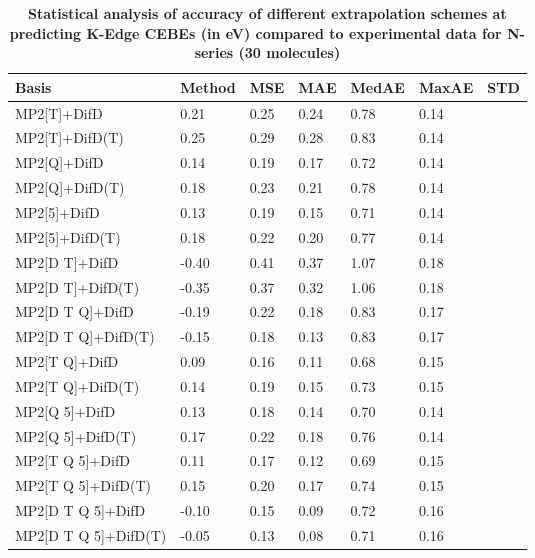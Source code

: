 \begin{table}
  \caption{\textbf{Statistical analysis of accuracy of different extrapolation schemes at predicting K-Edge CEBEs (in eV) compared to experimental data for N-series (30 molecules)}}
  \begin{tabular}{l l l l l l l }
    \toprule
    \textbf{Basis} & \textbf{Method} & \textbf{MSE} & \textbf{MAE} & \textbf{MedAE} & \textbf{MaxAE} & \textbf{STD} \\ 
    \midrule
    MP2[T]+DifD & 0.21 & 0.25 & 0.24 & 0.78 & 0.14 \\ 
    MP2[T]+DifD(T) & 0.25 & 0.29 & 0.28 & 0.83 & 0.14 \\ 
    MP2[Q]+DifD & 0.14 & 0.19 & 0.17 & 0.72 & 0.14 \\ 
    MP2[Q]+DifD(T) & 0.18 & 0.23 & 0.21 & 0.78 & 0.14 \\ 
    MP2[5]+DifD & 0.13 & 0.19 & 0.15 & 0.71 & 0.14 \\ 
    MP2[5]+DifD(T) & 0.18 & 0.22 & 0.20 & 0.77 & 0.14 \\ 
    MP2[D T]+DifD & -0.40 & 0.41 & 0.37 & 1.07 & 0.18 \\ 
    MP2[D T]+DifD(T) & -0.35 & 0.37 & 0.32 & 1.06 & 0.18 \\ 
    MP2[D T Q]+DifD & -0.19 & 0.22 & 0.18 & 0.83 & 0.17 \\ 
    MP2[D T Q]+DifD(T) & -0.15 & 0.18 & 0.13 & 0.83 & 0.17 \\ 
    MP2[T Q]+DifD & 0.09 & 0.16 & 0.11 & 0.68 & 0.15 \\ 
    MP2[T Q]+DifD(T) & 0.14 & 0.19 & 0.15 & 0.73 & 0.15 \\ 
    MP2[Q 5]+DifD & 0.13 & 0.18 & 0.14 & 0.70 & 0.14 \\ 
    MP2[Q 5]+DifD(T) & 0.17 & 0.22 & 0.18 & 0.76 & 0.14 \\ 
    MP2[T Q 5]+DifD & 0.11 & 0.17 & 0.12 & 0.69 & 0.15 \\ 
    MP2[T Q 5]+DifD(T) & 0.15 & 0.20 & 0.17 & 0.74 & 0.15 \\ 
    MP2[D T Q 5]+DifD & -0.10 & 0.15 & 0.09 & 0.72 & 0.16 \\ 
    MP2[D T Q 5]+DifD(T) & -0.05 & 0.13 & 0.08 & 0.71 & 0.16 \\ 
    \bottomrule
  \end{tabular}
\end{table}
